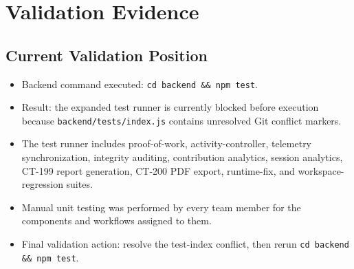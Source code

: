 \documentclass[11pt,a4paper]{article}
\begin{document}
\section{Validation Evidence}

\subsection{Current Validation Position}
\begin{itemize}
    \item Backend command executed: \texttt{cd backend \&\& npm test}.
    \item Result: the expanded test runner is currently blocked before execution because \texttt{backend/tests/index.js} contains unresolved Git conflict markers.
    \item The test runner includes proof-of-work, activity-controller, telemetry synchronization, integrity auditing, contribution analytics, session analytics, CT-199 report generation, CT-200 PDF export, runtime-fix, and workspace-regression suites.
    \item Manual unit testing was performed by every team member for the components and workflows assigned to them.
    \item Final validation action: resolve the test-index conflict, then rerun \texttt{cd backend \&\& npm test}.
\end{itemize}
\end{document}
